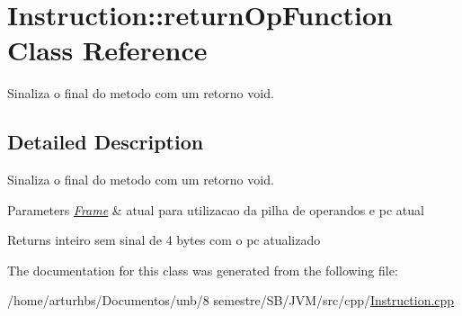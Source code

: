 \hypertarget{classInstruction_1_1returnOpFunction}{}\section{Instruction\+:\+:return\+Op\+Function Class Reference}
\label{classInstruction_1_1returnOpFunction}


Sinaliza o final do metodo com um retorno void.  




\subsection{Detailed Description}
Sinaliza o final do metodo com um retorno void. 


\begin{DoxyParams}{Parameters}
{\em \hyperlink{classFrame}{Frame}} & atual para utilizacao da pilha de operandos e pc atual \\
\hline
\end{DoxyParams}
\begin{DoxyReturn}{Returns}
inteiro sem sinal de 4 bytes com o pc atualizado 
\end{DoxyReturn}


The documentation for this class was generated from the following file\+:\begin{DoxyCompactItemize}
\item 
/home/arturhbs/\+Documentos/unb/8 semestre/\+S\+B/\+J\+V\+M/src/cpp/\hyperlink{Instruction_8cpp}{Instruction.\+cpp}\end{DoxyCompactItemize}
